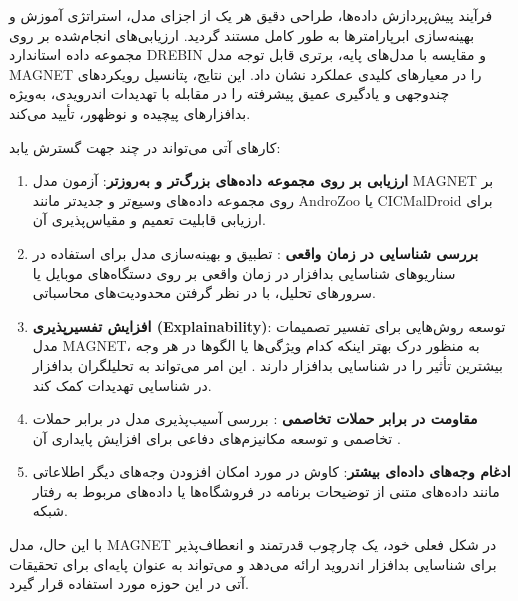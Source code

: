 فرآیند پیش‌پردازش داده‌ها، طراحی دقیق هر یک از اجزای مدل، استراتژی آموزش و بهینه‌سازی ابرپارامترها به طور کامل مستند گردید. ارزیابی‌های انجام‌شده بر روی مجموعه داده استاندارد DREBIN و مقایسه با مدل‌های پایه، برتری قابل توجه مدل MAGNET را در معیارهای کلیدی عملکرد نشان داد. این نتایج، پتانسیل رویکردهای چندوجهی و یادگیری عمیق پیشرفته را در مقابله با تهدیدات اندرویدی، به‌ویژه بدافزارهای پیچیده و نوظهور، تأیید می‌کند.

کارهای آتی می‌تواند در چند جهت گسترش یابد:
\begin{enumerate}
    \item \textbf{ارزیابی بر روی مجموعه داده‌های بزرگ‌تر و به‌روزتر}: آزمون مدل MAGNET بر روی مجموعه داده‌های وسیع‌تر و جدیدتر مانند AndroZoo \citep{Allix2016} یا CICMalDroid \citep{CICMalDroid} برای ارزیابی قابلیت تعمیم و مقیاس‌پذیری آن.
    \item \textbf{بررسی شناسایی در زمان واقعی }: تطبیق و بهینه‌سازی مدل برای استفاده در سناریوهای شناسایی بدافزار در زمان واقعی بر روی دستگاه‌های موبایل یا سرورهای تحلیل، با در نظر گرفتن محدودیت‌های محاسباتی.
    \item \textbf{افزایش تفسیرپذیری (Explainability)}: توسعه روش‌هایی برای تفسیر تصمیمات مدل MAGNET، به منظور درک بهتر اینکه کدام ویژگی‌ها یا الگوها در هر وجه بیشترین تأثیر را در شناسایی بدافزار دارند \citep{Marastoni2022}. این امر می‌تواند به تحلیلگران بدافزار در شناسایی تهدیدات کمک کند.
    \item \textbf{مقاومت در برابر حملات تخاصمی }: بررسی آسیب‌پذیری مدل در برابر حملات تخاصمی و توسعه مکانیزم‌های دفاعی برای افزایش پایداری آن \citep{Demontis2017}.
    \item \textbf{ادغام وجه‌های داده‌ای بیشتر}: کاوش در مورد امکان افزودن وجه‌های دیگر اطلاعاتی مانند داده‌های متنی از توضیحات برنامه در فروشگاه‌ها یا داده‌های مربوط به رفتار شبکه.
\end{enumerate}

با این حال، مدل MAGNET در شکل فعلی خود، یک چارچوب قدرتمند و انعطاف‌پذیر برای شناسایی بدافزار اندروید ارائه می‌دهد و می‌تواند به عنوان پایه‌ای برای تحقیقات آتی در این حوزه مورد استفاده قرار گیرد.

























